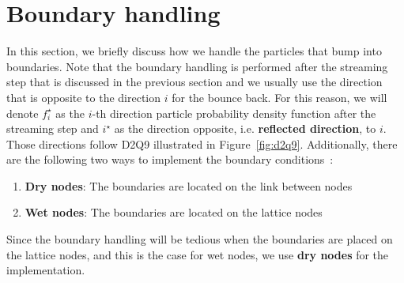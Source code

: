 \section{Boundary handling}
In this section, we briefly discuss how we handle
the particles that bump into boundaries.
Note that the boundary handling is performed
after the streaming step that is discussed in the previous section
and we usually use the direction that is opposite to
the direction $i$ for the bounce back.
For this reason, we will denote
$f^\star_i$ as the $i$-th direction
particle probability density function
after the streaming step
and $i^\star$ as the direction opposite,
i.e. {\bf reflected direction}, to $i$.
Those directions follow D2Q9 illustrated
in Figure~\ref{fig:d2q9}.
Additionally, there are the following
two ways to
implement the boundary conditions~\cite{liu2014lattice}:
\begin{enumerate}
  \item {\bf Dry nodes}:
  The boundaries are located on the link between nodes
  \item {\bf Wet nodes}:
  The boundaries are located on the lattice nodes
\end{enumerate}
Since the boundary handling will be tedious when
the boundaries are placed on the lattice nodes,
and this is the case for wet nodes,
we use {\bf dry nodes} for the implementation.

